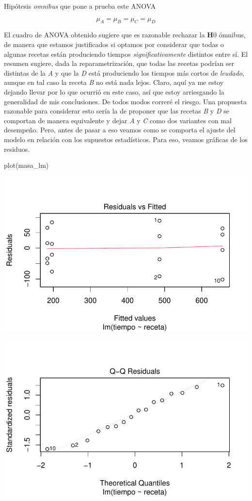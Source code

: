 \documentclass[
  letterpaper,
  DIV=11,
  numbers=noendperiod]{scrartcl}
\newenvironment{Shaded}{\begin{snugshade}}{\end{snugshade}}
\newcommand{\FunctionTok}[1]{\textcolor[rgb]{0.28,0.35,0.67}{#1}}
\newcommand{\NormalTok}[1]{\textcolor[rgb]{0.00,0.23,0.31}{#1}}
\begin{document}
Hipótesis \emph{omnibus} que pone a prueba este ANOVA

\[
\mu_A = \mu_B = \mu_C = \mu_D
\]

El cuadro de ANOVA obtenido sugiere que es razonable rechazar la
\textbf{H}0 ómnibus, de manera que estamos justificados si optamos por
considerar que todas o algunas recetas están produciendo tiempos
\emph{significativamente} distintos entre sí. El resumen sugiere, dada
la reparametrización, que todas las recetas podrían ser distintas de la
\emph{A} y que la \emph{D} está produciendo los tiempos más cortos de
\emph{leudado}, aunque en tal caso la receta \emph{B} no está nada
lejos. Claro, aquí ya me estoy dejando llevar por lo que ocurrió en este
caso, así que estoy arriesgando la generalidad de mis conclusiones. De
todos modos correré el riesgo. Una propuesta razonable para considerar
esto sería la de proponer que las recetas \emph{B} y \emph{D} se
comportan de manera equivalente y dejar \emph{A} y \emph{C} como dos
variantes con mal desempeño. Pero, antes de pasar a eso veamos como se
comporta el ajuste del modelo en relación con los supuestos
estadísticos. Para eso, veamos gráficas de los residuos.

\begin{Shaded}
\begin{Highlighting}[]
\FunctionTok{plot}\NormalTok{(masa\_lm)}
\end{Highlighting}
\end{Shaded}

\includegraphics{solucion-masa-pizza_files/figure-pdf/graf-modelo-1-1.pdf}

\includegraphics{solucion-masa-pizza_files/figure-pdf/graf-modelo-1-2.pdf}
\end{document}
